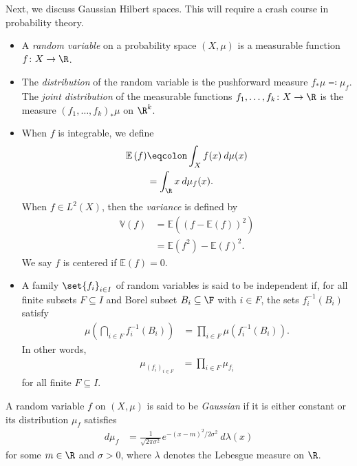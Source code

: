 \documentclass[10pt]{mypackage}
\begin{document}
Next, we discuss Gaussian Hilbert spaces. This will require a crash course in probability theory.
\begin{definition}\hfill
  \begin{itemize}
    \item A \textit{random variable} on a probability space $\left( X,\mu \right)$ is a measurable function $f\colon X\rightarrow \R$.
    \item The \textit{distribution} of the random variable is the pushforward measure $f_{\ast}\mu \eqcolon \mu_f$. The \textit{joint distribution} of the measurable functions $f_1,\dots,f_k\colon X\rightarrow \R$ is the measure $\left( f_1,\dots,f_k \right)_{\ast}\mu$ on $\R^k$.
    \item When $f$ is integrable, we define
      \begin{align*}
        \mathbb{E}\left( f \right) &\eqcolon \int_{X}^{} f(x)\:d\mu(x)\\
                                   &= \int_{\R}^{} x\:d\mu_f(x).
      \end{align*}
      When $f\in L^2\left( X \right)$, then the \textit{variance} is defined by
      \begin{align*}
        \mathbb{V}\left( f \right) &= \mathbb{E}\left( \left( f- \mathbb{E}\left( f \right) \right)^2 \right)\\
                                   &= \mathbb{E}\left( f^2 \right) - \mathbb{E}\left( f \right)^2.
      \end{align*}
      We say $f$ is centered if $ \mathbb{E}(f) = 0 $.
    \item A family $\set{f_i}_{i\in I}$ of random variables is said to be independent if, for all finite subsets $F\subseteq I$ and Borel subset $B_i\subseteq \F$ with $i\in F$, the sets $f_i^{-1}\left( B_i \right)$ satisfy
      \begin{align*}
        \mu\left( \bigcap_{i\in F}f_i^{-1}\left( B_i \right) \right) &= \prod_{i\in F}\mu\left( f_i^{-1}\left( B_i \right) \right).
      \end{align*}
      In other words,
      \begin{align*}
        \mu_{\left( f_i \right)_{i\in F}} &= \prod_{i\in F} \mu_{f_i}
      \end{align*}
      for all finite $F\subseteq I$.
  \end{itemize}
\end{definition}
\begin{definition}
  A random variable $f$ on $\left( X,\mu \right)$ is said to be \textit{Gaussian} if it is either constant or its distribution $\mu_f$ satisfies
  \begin{align*}
    d\mu_f &= \frac{1}{\sqrt{2\pi \sigma^2}} e^{-\left( x-m \right)^2/2\sigma^2}\:d\lambda(x)
  \end{align*}
  for some $m\in \R$ and $\sigma > 0$, where $\lambda$ denotes the Lebesgue measure on $\R$.
\end{definition}
\end{document}
